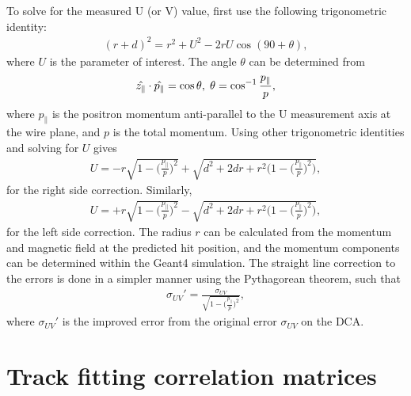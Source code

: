 To solve for the measured U (or V) value, first use the following trigonometric identity:
	\begin{align}
		(r+d)^{2} = r^{2}+U^{2}-2rU\cos(90+\theta),
	\end{align}
where $U$ is the parameter of interest. The angle $\theta$ can be determined from 
	\begin{align}
		\hat{z_{\parallel}} \cdot \hat{p_{\parallel}} = \cos{\theta}, \hspace{.1cm} \theta = \cos^{-1}{\frac{p_{\parallel}}{p}}, 
	\end{align}
where $p_{\parallel}$ is the positron momentum anti-parallel to the U measurement axis at the wire plane, and $p$ is the total momentum. Using other trigonometric identities and solving for $U$ gives
	\begin{align}
		U = -r\sqrt{1-\Big(\frac{p_{\parallel}}{p}\Big)^{2}} + \sqrt{d^{2} + 2dr + r^{2}\Big(1-\Big(\frac{p_{\parallel}}{p}\Big)^{2}\Big)},
	\end{align}
for the right side correction. Similarly,  
	\begin{align}
		U = +r\sqrt{1-\Big(\frac{p_{\parallel}}{p}\Big)^{2}} - \sqrt{d^{2} + 2dr + r^{2}\Big(1-\Big(\frac{p_{\parallel}}{p}\Big)^{2}\Big)},
	\end{align}
for the left side correction. The radius $r$ can be calculated from the momentum and magnetic field at the predicted hit position, and the momentum components can be determined within the Geant4 simulation. The straight line correction to the errors is done in a simpler manner using the Pythagorean theorem, such that
	\begin{align}
		\sigma_{UV}' = \frac{\sigma_{UV}}{\sqrt{1-\big(\frac{p_{\parallel}}{p}\big)^{2}}},
	\end{align}
where $\sigma_{UV}'$ is the improved error from the original error $\sigma_{UV}$ on the DCA.



\section{Track fitting correlation matrices}
\label{app:trackingCorrMatrices}



